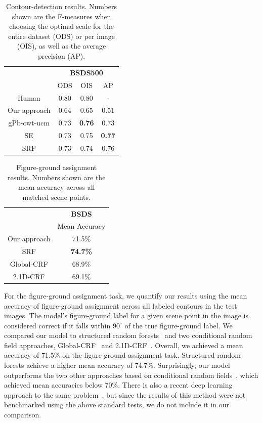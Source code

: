 \begin{table}[h!]
\centering
\begin{tabular}{|c|c|c|c| } 
 \cline{2-4}
 \multicolumn{1}{c}{} & \multicolumn{3}{|c|}{\textbf{BSDS500}} \\
 \cline{2-4}
 \multicolumn{1}{c|}{} & ODS & OIS & AP\\ 
 \hline
 Human & 0.80 & 0.80 & -\\ 
 \hline
  Our approach & 0.64 & 0.65 & 0.51 \\
 gPb-owt-ucm & 0.73 & \textbf{0.76} & 0.73 \\
 SE & 0.73 & 0.75 & \textbf{0.77} \\
 SRF & 0.73 & 0.74 & 0.76 \\
 \hline
\end{tabular}
\makeatletter
\let\@currsize\normalsize
\caption[Contour detection results]{Contour-detection results. Numbers shown are the F-measures when choosing the optimal scale for the entire dataset (ODS) or per image (OIS), as well as the average precision (AP).}
\label{tbl:Table1}
\end{table}

\begin{table}[h!]
\centering
\begin{tabular}{|c|c|} 
 \cline{2-2}
 \multicolumn{1}{c}{} & \multicolumn{1}{|c|}{\textbf{BSDS}} \\
\cline{2-2}
 \multicolumn{1}{c|}{} & Mean Accuracy \\ 
 \hline
  Our approach & 71.5\% \\
 SRF & \textbf{74.7\%} \\
 Global-CRF & 68.9\% \\
 2.1D-CRF & 69.1\% \\
 \hline
\end{tabular}
\makeatletter
\let\@currsize\normalsize
\caption[Figure-ground assignment results]{Figure-ground assignment results. Numbers shown are the mean accuracy across all matched scene points.}
\label{tbl:Table2}
\end{table}

For the figure-ground assignment task, we quantify our results using the mean accuracy of figure-ground assignment across all labeled contours in the test images. The model's figure-ground label for a given scene point in the image is considered correct if it falls within $90^{\circ}$ of the true figure-ground label. We compared our model to structured random forests~\citep[][SRF]{Teo_etal15} and two conditional random field approaches, Global-CRF~\citep{Ren_etal06} and 2.1D-CRF~\citep{Leichter_Lindenbaum09}. Overall, we achieved a mean accuracy of 71.5\% on the figure-ground assignment task. Structured random forests achieve a higher mean accuracy of 74.7\%. Surprisingly, our model outperforms the two other approaches based on conditional random fields~\citep{Ren_etal06,Leichter_Lindenbaum09}, which achieved mean accuracies below 70\%. There is also a recent deep learning approach to the same problem~\citep{Wang_Yuille16}, but since the results of this method were not benchmarked using the above standard tests, we do not include it in our comparison.

